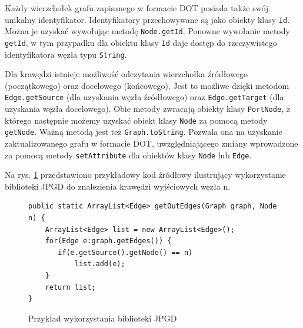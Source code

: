 Każdy wierzchołek grafu zapisanego w formacie DOT posiada także swój unikalny identyfikator. Identyfikatory przechowywane są jako obiekty klasy \texttt{Id}. Można je uzyskać wywołując metodę \texttt{Node.getId}. Ponowne wywołanie metody \texttt{getId}, w tym przypadku dla obiektu klasy \texttt{Id} daje dostęp do rzeczywistego identyfikatora węzła typu \texttt{String}. 

Dla krawędzi istnieje możliwość odczytania wierzchołka źródłowego (początkowego) oraz docelowego (końcowego). Jest to możliwe dzięki metodom \texttt{Edge.getSource} (dla uzyskania węzła źródłowego) oraz \texttt{Edge.getTarget} (dla uzyskania węzła docelowego). Obie metody zwracają obiekty klasy \texttt{PortNode}, z którego następnie możemy uzyskać obiekt klasy \texttt{Node} za pomocą metody \texttt{getNode}. Ważną metodą jest też \texttt{Graph.toString}. Pozwala ona na uzyskanie zaktualizowanego grafu w formacie DOT, uwzględniającego zmiany wprowadzone za pomocą metody \texttt{setAttribute} dla obiektów klasy \texttt{Node} lub \texttt{Edge}. 

Na rys. \ref{fig:jpgd} przedstawiono przykładowy kod źródłowy ilustrujący wykorzystanie biblioteki JPGD do znalezienia krawędzi wyjściowych węzła n.

\begin{figure}[H]
\begin{verbatim}
public static ArrayList<Edge> getOutEdges(Graph graph, Node n) {
    ArrayList<Edge> list = new ArrayList<Edge>();
    for(Edge e:graph.getEdges()) {
       if(e.getSource().getNode() == n)
           list.add(e);
    }
    return list;
}
\end{verbatim}
\caption{Przykład wykorzystania biblioteki JPGD}
\label{fig:jpgd}
\end{figure}


